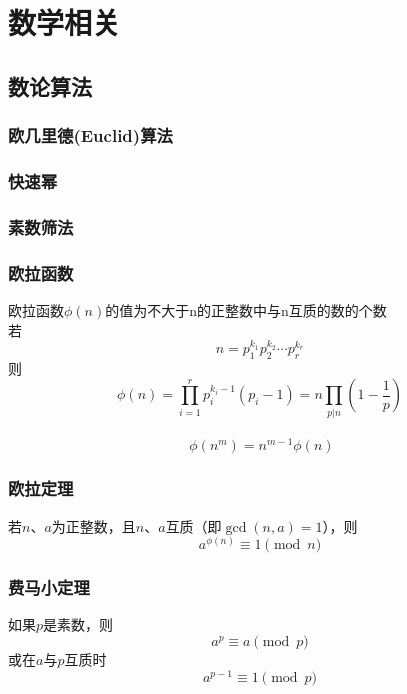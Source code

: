 
\section{数学相关}

\subsection{数论算法}
\subsubsection{欧几里德(Euclid)算法}
\subsubsection{快速幂}
\subsubsection{素数筛法}
\subsubsection{欧拉函数}
欧拉函数$\phi(n)$的值为不大于n的正整数中与n互质的数的个数\\
若
\begin{displaymath}
n = p_1^{k_1} p_2^{k_2} \cdots p_r^{k_r}
\end{displaymath}
则
\begin{displaymath}
\phi(n) = \prod_{i=1}^{r} p_{i}^{k_{i}-1}(p_{i}-1) = n\prod_{p|n}\left(1-\frac{1}{p}\right)
\end{displaymath}\\
\begin{displaymath}
\;\phi(n^{m}) = n^{m-1}\phi(n) 
\end{displaymath}
\subsubsection{欧拉定理}
若$n$、$a$为正整数，且$n$、$a$互质（即$\gcd(n,a)=1$），则
\begin{displaymath}
a^{\phi(n)} \equiv 1 \pmod n
\end{displaymath}
\subsubsection{费马小定理}
如果$p$是素数，则
\begin{displaymath}
a^{p} \equiv a \pmod{p}
\end{displaymath}
或在$a$与$p$互质时
\begin{displaymath}
a^{p-1} \equiv  1 \pmod{p}
\end{displaymath}
